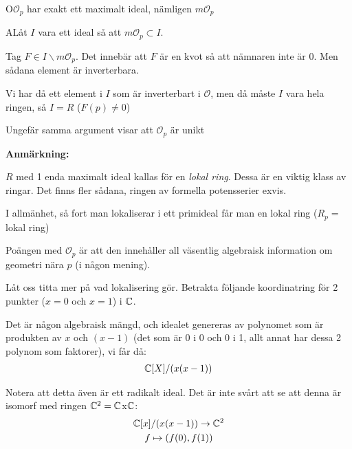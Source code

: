 \par\bigskip
\begin{theo}
  O$\mathcal{O}_p$ har exakt ett maximalt ideal, nämligen $m\mathcal{O}_p$
\end{theo}
\par\bigskip
\begin{prf}
  ALåt $I$ vara ett ideal så att $m\mathcal{O}_p\subset I$.\par
  \noindent Tag $F\in I\backslash m\mathcal{O}_p$. Det innebär att $F$ är en kvot så att nämnaren inte är 0. Men sådana element är inverterbara.\par
  \noindent Vi har då ett element i $I$ som är inverterbart i $\mathcal{O}$, men då måste $I$ vara hela ringen, så $I = R$ ($F(p)\neq0$)
  \par\bigskip
  \noindent Ungefär samma argument visar att $\mathcal{O}_p$ är unikt
\end{prf}
\par\bigskip
\noindent\textbf{Anmärkning:}\par
\noindent $R$ med 1 enda maximalt ideal kallas för en \textit{lokal ring}. Dessa är en viktig klass av ringar. Det finns fler sådana, ringen av formella potensserier exvis.
\par\bigskip
\noindent I allmänhet, så fort man lokaliserar i ett primideal får man en lokal ring ($R_p = $ lokal ring) 
\par\bigskip
\noindent Poängen med $\mathcal{O}_p$ är att den innehåller all väsentlig algebraisk information om geometri nära $p$ (i någon mening).\par
\par\bigskip
\noindent Låt oss titta mer på vad lokalisering gör. Betrakta följande koordinatring för 2 punkter ($x = 0$ och $x=1$) i $\mathbb{C}$.\par
\noindent Det är någon algebraisk mängd, och idealet genereras av polynomet som är produkten av $x$ och $(x-1)$ (det som är 0 i 0 och 0 i 1, allt annat har dessa 2 polynom som faktorer), vi får då:
\begin{equation*}
  \begin{gathered}
    \mathbb{C}[X]/(x(x-1))
  \end{gathered}
\end{equation*}\par
\noindent Notera att detta även är ett radikalt ideal. Det är inte svårt att se att denna är isomorf med ringen $\mathbb{C}^2 = \mathbb{C}$x$\mathbb{C}$:
\begin{equation*}
  \begin{gathered}
    \mathbb{C}[x]/(x(x-1))\to\mathbb{C}^2\\
    f\mapsto (f(0),f(1))
  \end{gathered}
\end{equation*}
